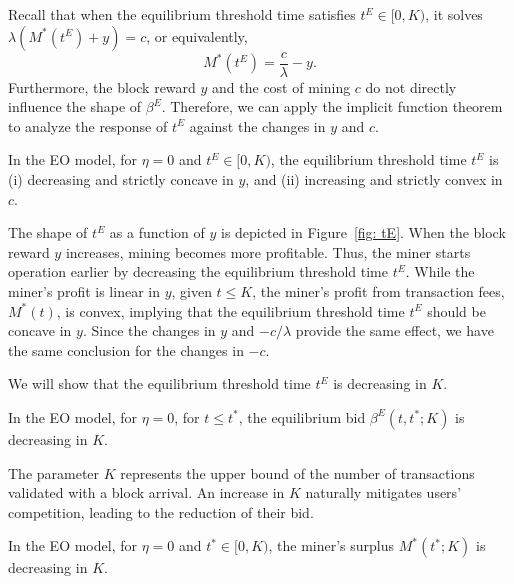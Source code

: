 \documentclass[12pt, letterpaper]{article}
\begin{document}
Recall that when the equilibrium threshold time satisfies $t^E \in [0, K)$, it solves $\lambda (M^*(t^E) + y) = c$, or equivalently,
\begin{equation}\label{eq: tE determination}
    M^*(t^E) = \frac{c}{\lambda} - y.
\end{equation}
Furthermore, the block reward $y$ and the cost of mining $c$ do not directly influence the shape of $\beta^E$. Therefore, we can apply the implicit function theorem to analyze the response of $t^E$ against the changes in $y$ and $c$.

\begin{prop}\label{prop: EO model tE response y and c}
    In the EO model, for $\eta = 0$ and $t^E \in [0, K)$, the equilibrium threshold time $t^E$ is (i) decreasing and strictly concave in $y$, and (ii) increasing and strictly convex in $c$.
\end{prop}




The shape of $t^E$ as a function of $y$ is depicted in Figure~\ref{fig: tE}. When the block reward $y$ increases, mining becomes more profitable. Thus, the miner starts operation earlier by decreasing the equilibrium threshold time $t^E$. While the miner's profit is linear in $y$, given $t \le K$, the miner's profit from transaction fees, $M^*(t)$, is convex, implying that the equilibrium threshold time $t^E$ should be concave in $y$. Since the changes in $y$ and $- c/\lambda$ provide the same effect, we have the same conclusion for the changes in $ - c$. 






We will show that the equilibrium threshold time $t^E$ is decreasing in $K$.


\begin{lem}\label{lem: beta E is decreasing in K}
In the EO model, for $\eta = 0$, for $t \le t^*$, the equilibrium bid $\beta^E(t, t^*; K)$ is decreasing in $K$.
\end{lem}

The parameter $K$ represents the upper bound of the number of transactions validated with a block arrival. An increase in $K$ naturally mitigates users' competition, leading to the reduction of their bid.






\begin{lem}\label{thm: M is decreasing in K}
    In the EO model, for $\eta = 0$ and $t^* \in [0, K)$, the miner's surplus $M^*(t^*; K)$ is decreasing in $K$.
\end{lem}
\end{document}

